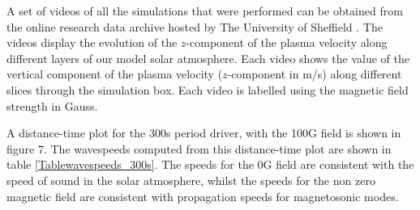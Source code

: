 \documentclass[linenumbers]{aastex63}
\begin{document}
A set of videos of all the simulations that were performed can be obtained from the online research data archive hosted by The University of Sheffield \citet{Griffiths2018a}. The videos display the evolution of the $z$-component of the plasma velocity along different layers of our model solar atmosphere. Each video shows the value of the vertical component of the plasma velocity ($z$-component in m/s) along different slices through the simulation box. Each video is labelled using the magnetic field strength in Gauss.









A distance-time plot for the 300s period driver, with the 100G field is shown in figure 7. The wavespeeds computed from this distance-time plot are shown in table \ref{Tablewavespeeds_300s}. The speeds for the 0G field are consistent with the speed of sound in the solar atmosphere, whilst the speeds for the non zero magnetic field are consistent with propagation speeds for magnetosonic modes.
\end{document}
